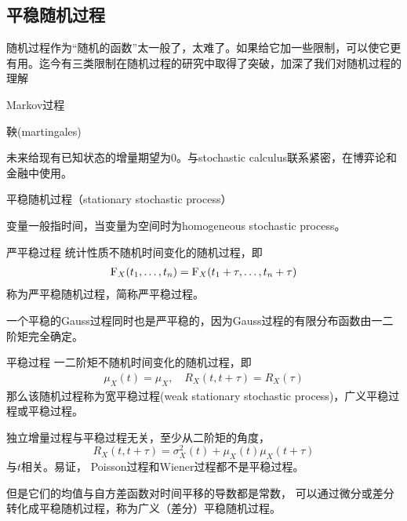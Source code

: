 \subsection{平稳随机过程}
随机过程作为“随机的函数”太一般了，太难了。如果给它加一些限制，可以使它更有用。迄今有三类限制在随机过程的研究中取得了突破，加深了我们对随机过程的理解
\begin{compactitem}
	\item Markov过程
	\item 鞅(martingales)
	
	未来给现有已知状态的增量期望为0。与stochastic calculus联系紧密，在博弈论和金融中使用。
	\item 平稳随机过程（stationary stochastic process）
	
	变量一般指时间，当变量为空间时为homogeneous stochastic process。
\end{compactitem}
\begin{definition}{严平稳过程}{}
	统计性质不随机时间变化的随机过程，即
	\begin{align*}
		\operatorname{F}_X(t_1,\ldots,t_n)=\operatorname{F}_X(t_1+\tau,\ldots,t_n+\tau)
	\end{align*}
	称为严平稳随机过程，简称严平稳过程。
\end{definition}
一个平稳的Gauss过程同时也是严平稳的，因为Gauss过程的有限分布函数由一二阶矩完全确定。
\begin{definition}{平稳过程}{}
	一二阶矩不随机时间变化的随机过程，即
	\begin{align}
		\mu_X(t)=\mu_X,\quad R_X(t,t+\tau)=R_X(\tau)
	\end{align}
	那么该随机过程称为宽平稳过程(weak stationary stochastic process)，广义平稳过程或平稳过程。
\end{definition}
独立增量过程与平稳过程无关，至少从二阶矩的角度，
\[
	R_X(t,t+\tau)=\sigma^2_X(t)+\mu_X(t)\mu_X(t+\tau)
\]
与$t$相关。易证，
Poisson过程和Wiener过程都不是平稳过程。

但是它们的均值与自方差函数对时间平移的导数都是常数，
可以通过微分或差分转化成平稳随机过程，称为广义（差分）平稳随机过程。
